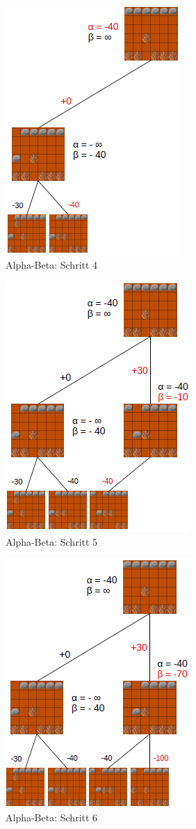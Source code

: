 \begin{figure}[h]
	\centering
	\includegraphics{img/ab4}
	\caption{Alpha-Beta: Schritt 4}
	\label{fig:ab4}
\end{figure}

\begin{figure}[h]
	\centering
	\includegraphics{img/ab5}
	\caption{Alpha-Beta: Schritt 5}
	\label{fig:ab5}
\end{figure}

\begin{figure}[h]
	\centering
	\includegraphics{img/ab6}
	\caption{Alpha-Beta: Schritt 6}
	\label{fig:ab6}
\end{figure}

